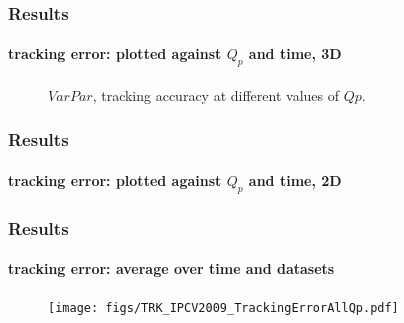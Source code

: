 \begin{frame}
\frametitle{Results}
\framesubtitle{tracking error: plotted against $Q_p$ and time, 3D}
\logoCSIPCPL\mypagenum
	\begin{figure}
		\centering
		\caption{$VarPar$, tracking accuracy at different values of $Qp$.}
	\end{figure}
\end{frame}



\begin{frame}
\frametitle{Results}
\framesubtitle{tracking error: plotted against $Q_p$ and time, 2D}
\logoCSIPCPL\mypagenum
	\begin{figure}
		\centering
	\end{figure}
\end{frame}





\begin{frame}
\frametitle{Results}
\framesubtitle{tracking error: average over time and datasets}
\logoCSIPCPL\mypagenum
	\begin{figure}
		\texttt{[image: figs/TRK\_IPCV2009\_TrackingErrorAllQp.pdf]}
	\end{figure}
\end{frame}





